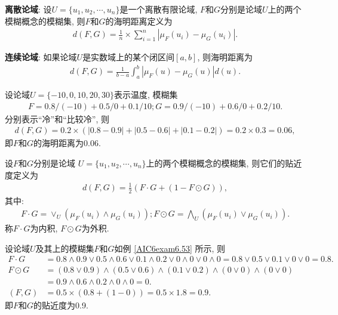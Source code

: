 \textbf{离散论域}: 设$U=\{u_1, u_2, \cdots, u_n\}$是一个离散有限论域, $F$和$G$分别是论域$U$上的两个模糊概念的模糊集, 则$F$和$G$的海明距离定义为
\begin{align}
    d(F, G)=\frac{1}{n} \times \sum_{i=1}^{n}\left|\mu_{F}\left(u_{i}\right)-\mu_{G}\left(u_{i}\right)\right|.
\end{align}

\textbf{连续论域}: 如果论域$U$是实数域上的某个闭区间$[a, b]$, 则海明距离为
\begin{align}
    d(F, G)=\frac{1}{b-a} \int_{a}^{b}\left|\mu_{F}(u)-\mu_{G}(u)\right| d(u).
\end{align}
\begin{example}\label{AIC6exam6.53}
设论域$U=\{-10, 0, 10, 20, 30\}$表示温度, 模糊集
\begin{align*}
    F= 0.8/(-10)+0.5/0+0.1/10; G=0.9/(-10)+0.6/0+0.2/10.
\end{align*}
分别表示“冷”和“比较冷”, 则
\begin{align*}
    d(F,G)=0.2\times (|0.8-0.9|+|0.5-0.6|+|0.1-0.2|)=0.2\times 0.3=0.06,
\end{align*}
即$F$和$G$的海明距离为0.06.
\end{example}

设$F$和$G$分别是论域 $U=\{u_1, u_2, \cdots, u_n\}$上的两个模糊概念的模糊集, 则它们的贴近度定义为
\begin{align*}
    d(F, G)=\frac 1 2( F\cdot G+(1-F\odot G)),
\end{align*}
其中:
\begin{align*}
    F \cdot G=\vee_{U}\left(\mu_{F}\left(u_{i}\right) \wedge \mu_{G}\left(u_{i}\right)\right); F \odot G=\bigwedge_{U}\left(\mu_{F}\left(u_{i}\right) \vee \mu_{G}\left(u_{i}\right)\right).
\end{align*}
称$F\cdot G$为内积, $F\odot G$为外积.
\begin{example}
设论域$U$及其上的模糊集$F$和$G$如例 \ref{AIC6exam6.53} 所示, 则
\begin{align*}
F\cdot G&=0.8\wedge 0.9\vee 0.5\wedge 0.6\vee 0.1\wedge 0.2 \vee  0\wedge 0\vee  0\wedge 0=0.8\vee 0.5\vee 0.1 \vee  0 \vee  0=0.8.\\
F\odot G&= (0.8\vee 0.9)\wedge (0.5\vee 0.6)\wedge (0.1\vee 0.2) \wedge (0\vee 0) \wedge (0\vee 0)\\
        &=0.9\wedge 0.6\wedge 0.2\wedge 0\wedge 0 =0.\\
(F, G)&=0.5\times (0.8+(1-0))=0.5\times 1.8=0.9.
\end{align*}
即$F$和$G$的贴近度为0.9.
\end{example}

